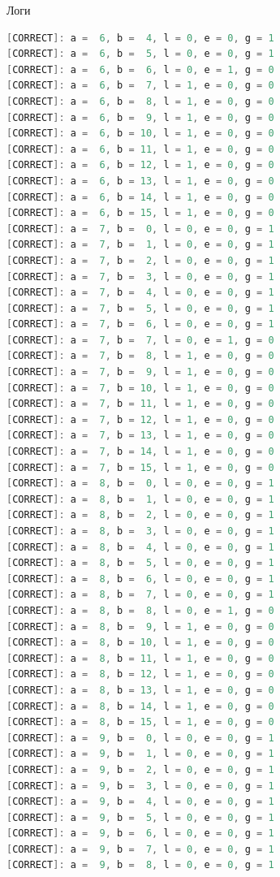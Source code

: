\documentclass[12pt,onecolumn]{article}
\begin{document}
Логи

\begin{lstlisting}[style=verilog, language=Verilog]
[CORRECT]: a =  6, b =  4, l = 0, e = 0, g = 1
[CORRECT]: a =  6, b =  5, l = 0, e = 0, g = 1
[CORRECT]: a =  6, b =  6, l = 0, e = 1, g = 0
[CORRECT]: a =  6, b =  7, l = 1, e = 0, g = 0
[CORRECT]: a =  6, b =  8, l = 1, e = 0, g = 0
[CORRECT]: a =  6, b =  9, l = 1, e = 0, g = 0
[CORRECT]: a =  6, b = 10, l = 1, e = 0, g = 0
[CORRECT]: a =  6, b = 11, l = 1, e = 0, g = 0
[CORRECT]: a =  6, b = 12, l = 1, e = 0, g = 0
[CORRECT]: a =  6, b = 13, l = 1, e = 0, g = 0
[CORRECT]: a =  6, b = 14, l = 1, e = 0, g = 0
[CORRECT]: a =  6, b = 15, l = 1, e = 0, g = 0
[CORRECT]: a =  7, b =  0, l = 0, e = 0, g = 1
[CORRECT]: a =  7, b =  1, l = 0, e = 0, g = 1
[CORRECT]: a =  7, b =  2, l = 0, e = 0, g = 1
[CORRECT]: a =  7, b =  3, l = 0, e = 0, g = 1
[CORRECT]: a =  7, b =  4, l = 0, e = 0, g = 1
[CORRECT]: a =  7, b =  5, l = 0, e = 0, g = 1
[CORRECT]: a =  7, b =  6, l = 0, e = 0, g = 1
[CORRECT]: a =  7, b =  7, l = 0, e = 1, g = 0
[CORRECT]: a =  7, b =  8, l = 1, e = 0, g = 0
[CORRECT]: a =  7, b =  9, l = 1, e = 0, g = 0
[CORRECT]: a =  7, b = 10, l = 1, e = 0, g = 0
[CORRECT]: a =  7, b = 11, l = 1, e = 0, g = 0
[CORRECT]: a =  7, b = 12, l = 1, e = 0, g = 0
[CORRECT]: a =  7, b = 13, l = 1, e = 0, g = 0
[CORRECT]: a =  7, b = 14, l = 1, e = 0, g = 0
[CORRECT]: a =  7, b = 15, l = 1, e = 0, g = 0
[CORRECT]: a =  8, b =  0, l = 0, e = 0, g = 1
[CORRECT]: a =  8, b =  1, l = 0, e = 0, g = 1
[CORRECT]: a =  8, b =  2, l = 0, e = 0, g = 1
[CORRECT]: a =  8, b =  3, l = 0, e = 0, g = 1
[CORRECT]: a =  8, b =  4, l = 0, e = 0, g = 1
[CORRECT]: a =  8, b =  5, l = 0, e = 0, g = 1
[CORRECT]: a =  8, b =  6, l = 0, e = 0, g = 1
[CORRECT]: a =  8, b =  7, l = 0, e = 0, g = 1
[CORRECT]: a =  8, b =  8, l = 0, e = 1, g = 0
[CORRECT]: a =  8, b =  9, l = 1, e = 0, g = 0
[CORRECT]: a =  8, b = 10, l = 1, e = 0, g = 0
[CORRECT]: a =  8, b = 11, l = 1, e = 0, g = 0
[CORRECT]: a =  8, b = 12, l = 1, e = 0, g = 0
[CORRECT]: a =  8, b = 13, l = 1, e = 0, g = 0
[CORRECT]: a =  8, b = 14, l = 1, e = 0, g = 0
[CORRECT]: a =  8, b = 15, l = 1, e = 0, g = 0
[CORRECT]: a =  9, b =  0, l = 0, e = 0, g = 1
[CORRECT]: a =  9, b =  1, l = 0, e = 0, g = 1
[CORRECT]: a =  9, b =  2, l = 0, e = 0, g = 1
[CORRECT]: a =  9, b =  3, l = 0, e = 0, g = 1
[CORRECT]: a =  9, b =  4, l = 0, e = 0, g = 1
[CORRECT]: a =  9, b =  5, l = 0, e = 0, g = 1
[CORRECT]: a =  9, b =  6, l = 0, e = 0, g = 1
[CORRECT]: a =  9, b =  7, l = 0, e = 0, g = 1
[CORRECT]: a =  9, b =  8, l = 0, e = 0, g = 1

\end{lstlisting}
\end{document}
